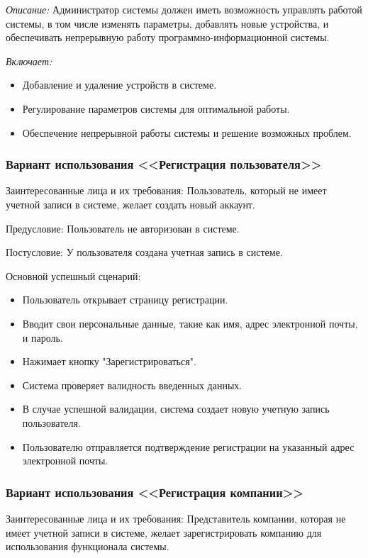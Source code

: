 \textit{Описание:} Администратор системы должен иметь возможность управлять работой системы, в том числе изменять параметры, добавлять новые устройства, и обеспечивать непрерывную работу программно-информационной системы.

\textit{Включает:} 
\begin{itemize}
	\item Добавление и удаление устройств в системе.
	\item Регулирование параметров системы для оптимальной работы.
	\item Обеспечение непрерывной работы системы и решение возможных проблем.
\end{itemize}



\subsubsection{Вариант использования <<Регистрация пользователя>>}

Заинтересованные лица и их требования: Пользователь, который не имеет учетной записи в системе, желает создать новый аккаунт.

Предусловие: Пользователь не авторизован в системе.

Постусловие: У пользователя создана учетная запись в системе.

Основной успешный сценарий:
\begin{itemize}
\item Пользователь открывает страницу регистрации.
\item Вводит свои персональные данные, такие как имя, адрес электронной почты, и пароль.
\item Нажимает кнопку "Зарегистрироваться".
\item Система проверяет валидность введенных данных.
\item В случае успешной валидации, система создает новую учетную запись пользователя.
\item Пользователю отправляется подтверждение регистрации на указанный адрес электронной почты.
\end{itemize}


\subsubsection{Вариант использования <<Регистрация компании>>}

Заинтересованные лица и их требования: Представитель компании, которая не имеет учетной записи в системе, желает зарегистрировать компанию для использования функционала системы.

